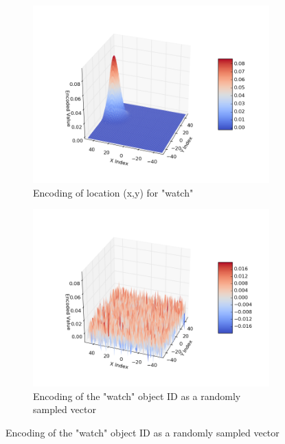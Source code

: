 \documentclass[journal]{journal}
\begin{document}
\begin{figure}[th!]
		\begin{subfigure}{0.45\columnwidth}
			\center
			\includegraphics[width=\linewidth]{img/coord_example_1.png}
			\caption{Encoding of location (x,y) for "watch"}
			\label{fig:encoding-coord}
		\end{subfigure}
		\begin{subfigure}{0.45\columnwidth}
			\center
			\includegraphics[width=\linewidth]{img/coord_example_2.png}
			\caption{Encoding of the "watch" object ID as a randomly sampled vector}
			\label{fig:encoding-object}
		\end{subfigure}
		

\end{figure}
\end{document}
